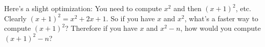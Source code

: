 Here's a slight optimization:
You need to compute $x^2$ and then $(x + 1)^2$, etc.
Clearly $(x + 1)^2 = x^2 + 2x + 1$.
So if you have $x$ and $x^2$, what's a faster way to compute $(x + 1)^2$?
Therefore if you have $x$ and $x^2 - n$, how would you compute
$(x+1)^2 - n$?
